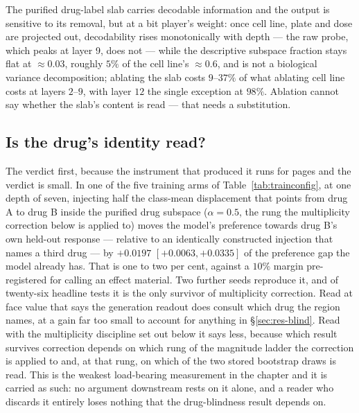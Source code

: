 \begin{claim}
The purified drug-label slab carries decodable information and the output is sensitive to its
removal, but at a bit player's weight: once cell line, plate and dose are projected out, decodability
rises monotonically with depth --- the raw probe, which peaks at layer 9, does not --- while the
descriptive subspace fraction stays flat at $\approx 0.03$, roughly $5\%$ of the cell line's
$\approx 0.6$, and is not a biological variance decomposition; ablating the slab costs
$9$--$37\%$ of what ablating cell line costs at
layers $2$--$9$, with layer $12$ the single exception at $98\%$. Ablation cannot say whether the
slab's content is read --- that needs a substitution.
\end{claim}

\subsection{Is the drug's identity read?}
\label{sec:res-mechanism}

The verdict first, because the instrument that produced it runs for pages and the verdict is small.
In one of the five training arms of Table~\ref{tab:trainconfig}, at one depth of seven, injecting
half the class-mean displacement that points from drug A to drug B inside the purified drug subspace
($\alpha = 0.5$, the rung the multiplicity correction below is applied to) moves the model's
preference towards drug B's own held-out response --- relative to an identically constructed
injection that names a third drug --- by $+0.0197$ \nolinebreak[3]$[+0.0063, +0.0335]$ of the
preference gap the model already has. That is one to two
per cent, against a $10\%$ margin pre-registered for calling an effect material. Two further seeds
reproduce it, and of twenty-six headline tests it is the only survivor of multiplicity correction.
Read at face value that says the generation readout does consult which drug the region names, at a
gain far too small to account for anything in \S\ref{sec:res-blind}. Read with the multiplicity
discipline set out below it says less, because which result survives correction depends on which
rung of the magnitude ladder the correction is applied to and, at that rung, on which of the two
stored bootstrap draws is read. This is the weakest load-bearing
measurement in the chapter and it is carried as such: no argument downstream rests on it alone, and
a reader who discards it entirely loses nothing that the drug-blindness result depends on.

